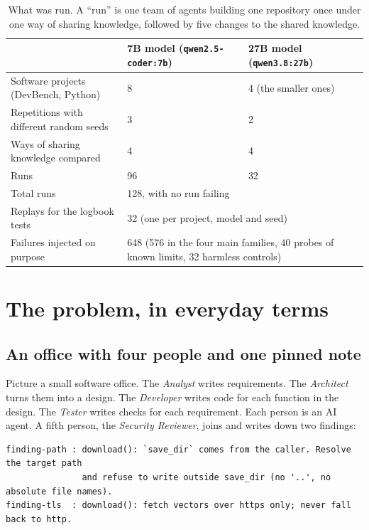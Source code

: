 \documentclass[10pt,a4paper]{article}
\newcommand{\code}[1]{\texttt{#1}}
\begin{document}
\begin{table}[h]
\centering\small
\caption{What was run. A ``run'' is one team of agents building one repository once under one way of sharing
knowledge, followed by five changes to the shared knowledge.}
\label{tab:scope}
\begin{tabular}{@{}lll@{}}
\toprule
 & 7B model (\code{qwen2.5-coder:7b}) & 27B model (\code{qwen3.8:27b}) \\
\midrule
Software projects (DevBench, Python) & 8 & 4 (the smaller ones) \\
Repetitions with different random seeds & 3 & 2 \\
Ways of sharing knowledge compared & 4 & 4 \\
Runs & 96 & 32 \\
\midrule
Total runs & \multicolumn{2}{p{7.5cm}}{128, with no run failing} \\
Replays for the logbook tests & \multicolumn{2}{p{7.5cm}}{32 (one per project, model and seed)} \\
Failures injected on purpose & \multicolumn{2}{p{7.5cm}}{648 (576 in the four main families, 40 probes of known limits, 32 harmless controls)} \\
\bottomrule
\end{tabular}
\end{table}

\section{The problem, in everyday terms}\label{sec:problem}

\subsection{An office with four people and one pinned note}

Picture a small software office. The \emph{Analyst} writes requirements. The \emph{Architect} turns them
into a design. The \emph{Developer} writes code for each function in the design. The \emph{Tester} writes
checks for each requirement. Each person is an AI agent. A fifth person, the \emph{Security Reviewer}, joins
and writes down two findings:

\begin{lstlisting}[style=raw, caption={The security reviewer's findings for the \code{chakin} word-vector downloader (real text from the runs).}, label={lst:findings}]
finding-path : download(): `save_dir` comes from the caller. Resolve the target path
               and refuse to write outside save_dir (no '..', no absolute file names).
finding-tls  : download(): fetch vectors over https only; never fall back to http.
\end{lstlisting}
\end{document}
